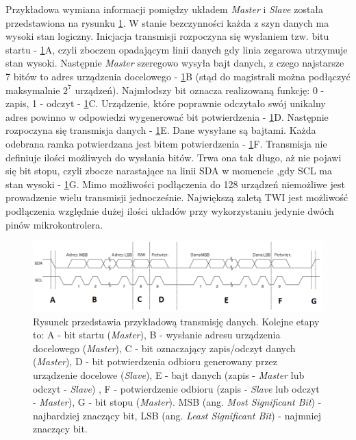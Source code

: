 \newline
\noindent
Przykładowa wymiana informacji pomiędzy układem \textit{Master} i \textit{Slave} została przedstawiona na rysunku \ref{trans_TWI}. W stanie bezczynności każda z szyn danych ma wysoki stan logiczny. Inicjacja transmisji rozpoczyna się wysłaniem tzw. bitu startu - \ref{trans_TWI}A, czyli zboczem opadającym linii danych gdy linia zegarowa utrzymuje stan wysoki. Następnie \textit{Master} szeregowo wysyła bajt danych, z czego najstarsze 7 bitów to adres urządzenia docelowego - \ref{trans_TWI}B (stąd do magistrali można podłączyć maksymalnie $2^7$ urządzeń). Najmłodszy bit oznacza realizowaną funkcję: 0 - zapis, 1 - odczyt - \ref{trans_TWI}C. Urządzenie, które poprawnie odczytało swój unikalny adres powinno w odpowiedzi wygenerować bit potwierdzenia - \ref{trans_TWI}D. Następnie rozpoczyna się transmisja danych - \ref{trans_TWI}E. Dane wysyłane są bajtami. Każda odebrana ramka potwierdzana jest bitem potwierdzenia - \ref{trans_TWI}F. Transmisja nie definiuje ilości możliwych do wysłania bitów. Trwa ona tak długo, aż nie pojawi się bit stopu, czyli zbocze narastające na linii SDA w momencie ,gdy SCL ma stan wysoki - \ref{trans_TWI}G. Mimo możliwości podłączenia do 128 urządzeń niemożliwe jest prowadzenie wielu transmisji jednocześnie. Największą zaletą TWI jest możliwość podłączenia względnie dużej ilości układów przy wykorzystaniu jedynie dwóch pinów mikrokontrolera. 
\begin{figure}[H]
    \begin{center}
      \includegraphics[scale=0.6]{imgs/transmisja_twi.png}
 	\caption[Transmisja TWI.]{\small{Rysunek przedstawia przykładową transmisję danych. Kolejne etapy to: A - bit startu (\textit{Master}), B - wysłanie adresu urządzenia docelowego (\textit{Master}), C - bit oznaczający zapis/odczyt danych (\textit{Master}), D - bit potwierdzenia odbioru generowany przez urządzenie docelowe (\textit{Slave}), E - bajt danych (zapis - \textit{Master} lub odczyt - \textit{Slave}) , F - potwierdzenie odbioru (zapis - \textit{Slave} lub odczyt - \textit{Master}), G - bit stopu (\textit{Master}). MSB (ang. \textit{Most Significant Bit}) - najbardziej znaczący bit, LSB (ang. \textit{Least Significant Bit}) - najmniej znaczący bit. }\footnotemark}
	\label{trans_TWI}
    \end{center}
  \end{figure}  
  	  
